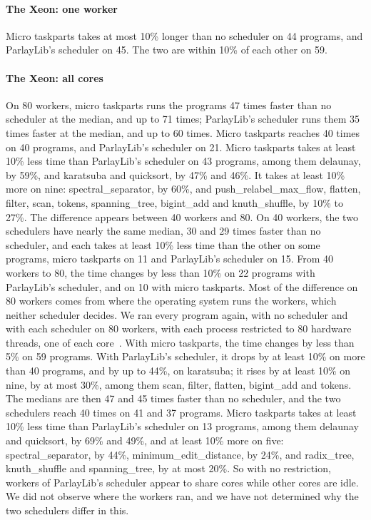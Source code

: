 \documentclass[sigplan,nonacm]{acmart}
\begin{document}
\paragraph{The Xeon: one worker}
%
Micro taskparts takes at most 10\% longer than no scheduler on 44
programs, and ParlayLib's scheduler on 45.
%
The two are within 10\% of each other on 59.

\paragraph{The Xeon: all cores}
%
On 80 workers, micro taskparts runs the programs 47 times faster than
no scheduler at the median, and up to 71 times; ParlayLib's scheduler
runs them 35 times faster at the median, and up to 60 times.
%
Micro taskparts reaches 40 times on 40 programs, and ParlayLib's
scheduler on 21.
%
Micro taskparts takes at least 10\% less time than ParlayLib's
scheduler on 43 programs, among them delaunay, by 59\%, and karatsuba
and quicksort, by 47\% and 46\%.
%
It takes at least 10\% more on nine: spectral\_separator, by 60\%,
and push\_relabel\_max\_flow, flatten, filter, scan, tokens,
spanning\_tree, bigint\_add and knuth\_shuffle, by 10\% to 27\%.
%
The difference appears between 40 workers and 80.
%
On 40 workers, the two schedulers have nearly the same median, 30 and
29 times faster than no scheduler, and each takes at least 10\% less
time than the other on some programs, micro taskparts on 11 and
ParlayLib's scheduler on 15.
%
From 40 workers to 80, the time changes by less than 10\% on 22
programs with ParlayLib's scheduler, and on 10 with micro taskparts.
%
Most of the difference on 80 workers comes from where the operating
system runs the workers, which neither scheduler decides.
%
We ran every program again, with no scheduler and with each scheduler
on 80 workers, with each process restricted to 80 hardware threads,
one of each core~\cite{flexibench-suitepercore}.
%
With micro taskparts, the time changes by less than 5\% on 59
programs.
%
With ParlayLib's scheduler, it drops by at least 10\% on more than 40
programs, and by up to 44\%, on karatsuba; it rises by at least 10\%
on nine, by at most 30\%, among them scan, filter, flatten, bigint\_add
and tokens.
%
The medians are then 47 and 45 times faster than no scheduler, and the
two schedulers reach 40 times on 41 and 37 programs.
%
Micro taskparts takes at least 10\% less time than ParlayLib's
scheduler on 13 programs, among them delaunay and quicksort, by 69\%
and 49\%, and at least 10\% more on five: spectral\_separator, by
44\%, minimum\_edit\_distance, by 24\%, and radix\_tree,
knuth\_shuffle and spanning\_tree, by at most 20\%.
%
So with no restriction, workers of ParlayLib's scheduler appear to
share cores while other cores are idle.
%
We did not observe where the workers ran, and we have not determined
why the two schedulers differ in this.
\end{document}
